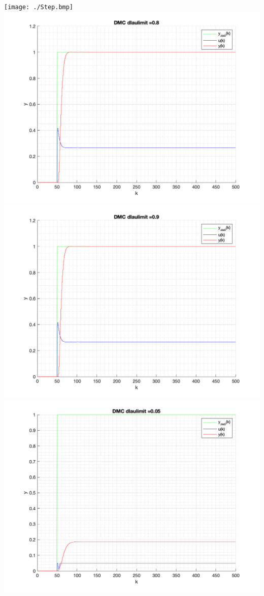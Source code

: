 \documentclass[a4paper, 11pt]{article}
\begin{document}
\begin{enumerate}
 \texttt{[image: ./Step.bmp]} 
 \includegraphics{./ModelsP6_ulimit/P4_DMC_ulimit_0.8.png} 
 \includegraphics{./ModelsP6_ulimit/P4_DMC_ulimit_0.9.png} 
 \includegraphics{./ModelsP6_ulimit/P4_DMC_ulimit_0.05.png} 

\end{enumerate}
\end{document}

